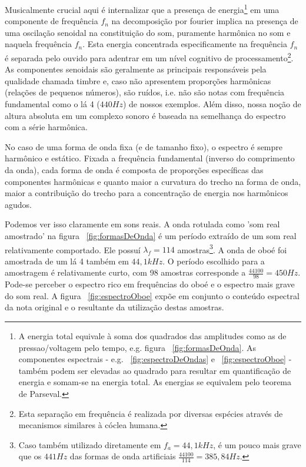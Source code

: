 Musicalmente crucial aqui é internalizar que a presença de
energia\footnote{A energia total equivale à soma dos quadrados das amplitudes como as de pressao/voltagem pelo tempo, e.g. figura ~\ref{fig:formasDeOnda}.
As componentes espectrais - e.g. ~\ref{fig:espectroDeOndas} e ~\ref{fig:espectroOboe} -
também podem ser elevadas ao quadrado para resultar em quantificação de energia e somam-se na energia total. As energias se equivalem pelo teorema de Parseval.}
em uma componente de frequência $f_n$ na decomposição por fourier 
implica na presença de uma oscilação senoidal na constituição do som, puramente harmônica no som e naquela frequência $f_n$. Esta energia concentrada especificamente na frequência $f_n$ é separada
 pelo ouvido para adentrar em um nível cognitivo de processamento\footnote{Esta separação em frequência é realizada por diversas espécies através de mecanismos similares à cóclea humana.}.
  As componentes senoidais são geralmente as principais responsáveis pela qualidade chamada timbre e, caso não apresentem proporções harmônicas (relações de pequenos números), são ruídos, i.e. não são notas com frequência fundamental como o lá 4 ($440 Hz$) de nossos exemplos. Além disso, nossa noção de altura absoluta em um complexo sonoro é baseada na semelhança do espectro com a série harmônica.

No caso de uma forma de onda fixa (e de tamanho fixo), o espectro é sempre harmônico e estático. Fixada a frequência fundamental (inverso do comprimento da onda), cada forma de onda é composta de proporções específicas das componentes harmônicas e 
quanto maior a curvatura do trecho na forma de onda, maior a contribuição do trecho para a
concentração de energia nos harmônicos agudos.

Podemos ver isso claramente em sons reais. A onda rotulada como 'som real amostrado' na figura ~\ref{fig:formasDeOnda} é um período extraído de um som real relativamente comportado. Ele possuí $\lambda_f=114$ amostras\footnote{Caso também utilizado diretamente em $f_a=44,1kHz$, é um pouco mais grave que os $441 Hz$ das formas de onda artificiais $\frac{44100}{114}=385,84Hz$.}. A onda de oboé foi amostrada de um lá 4 também em $44,1kHz$. O período escolhido para a amostragem é relativamente curto, com 98 amostras corresponde a $\frac{44100}{98}=450 Hz$. Pode-se perceber o espectro rico em frequências do oboé e o espectro mais grave do som real. A figura ~\ref{fig:espectroOboe} 
expõe em conjunto o conteúdo espectral da nota original e o resultante da utilização destas amostras.

